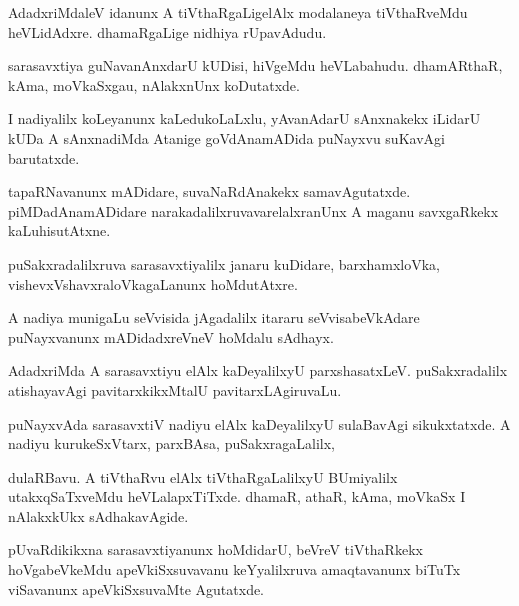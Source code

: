 \documentclass{article}
\begin{document}
\begin{mn}
AdadxriMdaleV  idanunx  A  tiVthaRgaLigelAlx  modalaneya  tiVthaRveMdu  
heVLidAdxre.  dhamaRgaLige  nidhiya  rUpavAdudu.
\end{mn}

\begin{mn}
sarasavxtiya  guNavanAnxdarU  kUDisi,  hiVgeMdu  heVLabahudu.  dhamARthaR,  
kAma,  moVkaSxgau,  nAlakxnUnx koDutatxde.
\end{mn}

\begin{mn}
I nadiyalilx  koLeyanunx kaLedukoLaLxlu,  yAvanAdarU  sAnxnakekx  iLidarU  
kUDa A  sAnxnadiMda  Atanige  goVdAnamADida  puNayxvu  suKavAgi  barutatxde.
\end{mn}

\begin{mn}
tapaRNavanunx  mADidare,  suvaNaRdAnakekx  samavAgutatxde.  piMDadAnamADidare  
narakadalilxruvavarelalxranUnx  A  maganu  savxgaRkekx  kaLuhisutAtxne.
\end{mn}

\begin{mn}
puSakxradalilxruva  sarasavxtiyalilx  janaru  kuDidare,  barxhamxloVka,  
vishevxVshavxraloVkagaLanunx  hoMdutAtxre.
\end{mn}

\begin{mn}
A  nadiya  munigaLu  seVvisida  jAgadalilx  itararu  seVvisabeVkAdare  
puNayxvanunx  mADidadxreVneV  hoMdalu sAdhayx.
\end{mn}

\begin{mn}
AdadxriMda  A  sarasavxtiyu  elAlx  kaDeyalilxyU  parxshasatxLeV.  puSakxradalilx  
atishayavAgi  pavitarxkikxMtalU  pavitarxLAgiruvaLu. 
\end{mn}

\begin{mn}
puNayxvAda  sarasavxtiV  nadiyu  elAlx  kaDeyalilxyU  sulaBavAgi  sikukxtatxde.  A  nadiyu  kurukeSxVtarx,  parxBAsa,  puSakxragaLalilx,
\end{mn}

\begin{mn}
dulaRBavu.  A  tiVthaRvu  elAlx  tiVthaRgaLalilxyU  BUmiyalilx  utakxqSaTxveMdu  
heVLalapxTiTxde.  dhamaR,  athaR,  kAma,  moVkaSx  I  nAlakxkUkx  sAdhakavAgide.
\end{mn}

\begin{mn}
pUvaRdikikxna  sarasavxtiyanunx  hoMdidarU,  beVreV  tiVthaRkekx  hoVgabeVkeMdu  
apeVkiSxsuvavanu  keYyalilxruva  amaqtavanunx  biTuTx  viSavanunx  apeVkiSxsuvaMte  Agutatxde.
\end{mn}
\end{document}
